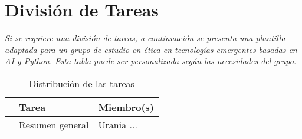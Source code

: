 \chapter{División de Tareas}

\emph{Si se requiere una división de tareas, a continuación se presenta una plantilla adaptada para un grupo de estudio en ética en tecnologías emergentes basadas en AI y Python. Esta tabla puede ser personalizada según las necesidades del grupo.}
\begin{table}[htb]
    \setlength\extrarowheight{4pt}
    \centering
    \caption{Distribución de las tareas}
    \label{tab:taskdivision}
    \begin{tabularx}{\textwidth}{lXX}
        \toprule
        & Tarea & Miembro(s) \\
        \midrule
        & Resumen general & Urania ... \\
        

\end{tabularx}
\end{table}
